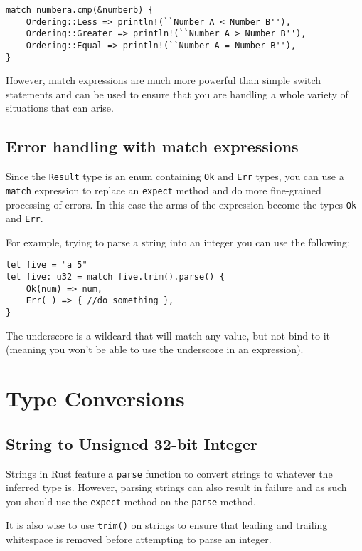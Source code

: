 \documentclass[12pt,notitlepage]{article}
\begin{document}
\begin{lstlisting}
match numbera.cmp(&numberb) {
    Ordering::Less => println!(``Number A < Number B''),
    Ordering::Greater => println!(``Number A > Number B''),
    Ordering::Equal => println!(``Number A = Number B''),
}
\end{lstlisting}

However, match expressions are much more powerful than simple switch statements
and can be used to ensure that you are handling a whole variety of situations
that can arise.

\subsection{Error handling with match expressions}

Since the \lstinline{Result} type is an enum containing \lstinline{Ok} and
\lstinline{Err} types, you can use a \lstinline{match} expression to replace an
\lstinline{expect} method and do more fine-grained processing of errors. In
this case the arms of the expression become the types \lstinline{Ok} and
\lstinline{Err}.

For example, trying to parse a string into an integer you can use the
following:

\begin{lstlisting}
let five = "a 5"
let five: u32 = match five.trim().parse() {
    Ok(num) => num,
    Err(_) => { //do something },
}
\end{lstlisting}

The underscore is a wildcard that will match any value, but not bind to it
(meaning you won't be able to use the underscore in an expression).


\section{Type Conversions}

\subsection{String to Unsigned 32-bit Integer}

Strings in Rust feature a \lstinline{parse} function to convert strings to
whatever the inferred type is. However, parsing strings can also result in
failure and as such you should use the \lstinline{expect} method on the
\lstinline{parse} method.

It is also wise to use \lstinline{trim()} on strings to ensure that leading and
trailing whitespace is removed before attempting to parse an integer.
\end{document}
